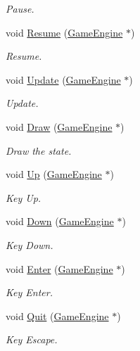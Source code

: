 \begin{DoxyCompactItemize}
\begin{DoxyCompactList}\small\item\em Pause. \end{DoxyCompactList}\item 
void \hyperlink{class_intro_state_ac82ca5f59f2e0fd8bcbd9334046f6b50}{Resume} (\hyperlink{class_game_engine}{Game\+Engine} $\ast$)
\begin{DoxyCompactList}\small\item\em Resume. \end{DoxyCompactList}\item 
void \hyperlink{class_intro_state_a4071906c4ca7d81687e2b90b7f36a664}{Update} (\hyperlink{class_game_engine}{Game\+Engine} $\ast$)
\begin{DoxyCompactList}\small\item\em Update. \end{DoxyCompactList}\item 
void \hyperlink{class_intro_state_a7509d07478cfd23c5180db2831908ca9}{Draw} (\hyperlink{class_game_engine}{Game\+Engine} $\ast$)
\begin{DoxyCompactList}\small\item\em Draw the state. \end{DoxyCompactList}\item 
void \hyperlink{class_intro_state_aeed77b6e9a15471c1110c47b0a854fe1}{Up} (\hyperlink{class_game_engine}{Game\+Engine} $\ast$)
\begin{DoxyCompactList}\small\item\em Key Up. \end{DoxyCompactList}\item 
void \hyperlink{class_intro_state_a812834ff23fc358fef6ce2bd554d9386}{Down} (\hyperlink{class_game_engine}{Game\+Engine} $\ast$)
\begin{DoxyCompactList}\small\item\em Key Down. \end{DoxyCompactList}\item 
void \hyperlink{class_intro_state_a6f39be642d7ae2f714262246a7801989}{Enter} (\hyperlink{class_game_engine}{Game\+Engine} $\ast$)
\begin{DoxyCompactList}\small\item\em Key Enter. \end{DoxyCompactList}\item 
void \hyperlink{class_intro_state_a7ede5ff0f84054f234efb566a0175aa5}{Quit} (\hyperlink{class_game_engine}{Game\+Engine} $\ast$)
\begin{DoxyCompactList}\small\item\em Key Escape. \end{DoxyCompactList}\item 

\end{DoxyCompactItemize}
